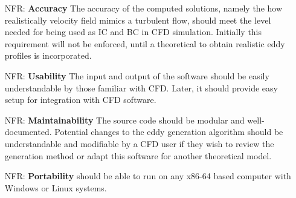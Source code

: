 \documentclass[12pt]{article}
\newcounter{nfrnum} %
\begin{document}
\noindent \begin{itemize}

\item[NFR\refstepcounter{nfrnum}\thenfrnum \label{NFR_Accuracy}:]
  \textbf{Accuracy} The accuracy of the computed solutions, namely the how realistically velocity field mimics a turbulent flow, should meet the level needed for being used as IC and BC in CFD simulation. Initially this requirement will not be enforced, until a theoretical to obtain realistic eddy profiles is incorporated.

\item[NFR\refstepcounter{nfrnum}\thenfrnum \label{NFR_Usability}:] \textbf{Usability} The input and output of the software should be easily understandable by those familiar with CFD. Later, it should provide easy setup for integration with CFD software.

\item[NFR\refstepcounter{nfrnum}\thenfrnum \label{NFR_Maintainability}:]
  \textbf{Maintainability} The source code should be modular and well-documented. Potential changes to the eddy generation algorithm should be understandable and modifiable by a CFD user if they wish to review the generation method or adapt this software for another theoretical model. 

\item[NFR\refstepcounter{nfrnum}\thenfrnum \label{NFR_Portability}:]
  \textbf{Portability} \progname{} should be able to run on any x86-64 based computer with Windows or Linux systems.


\end{itemize}
\end{document}
